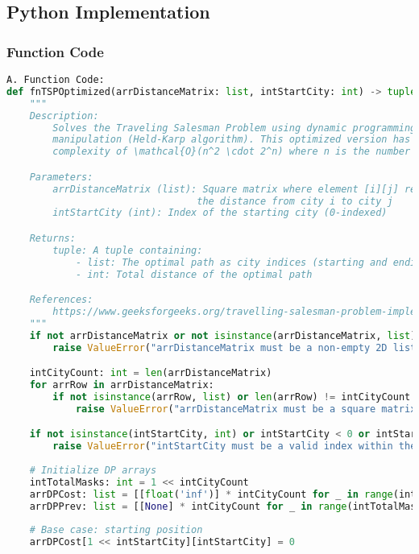 \documentclass{article}
\begin{document}
\subsection*{Python Implementation}
\subsubsection*{Function Code}
\begin{lstlisting}[language=Python]
A. Function Code:
def fnTSPOptimized(arrDistanceMatrix: list, intStartCity: int) -> tuple[list, int]:
    """
    Description:
        Solves the Traveling Salesman Problem using dynamic programming with bit 
        manipulation (Held-Karp algorithm). This optimized version has a time 
        complexity of \mathcal{O}(n^2 \cdot 2^n) where n is the number of cities.

    Parameters:
        arrDistanceMatrix (list): Square matrix where element [i][j] represents 
                                 the distance from city i to city j
        intStartCity (int): Index of the starting city (0-indexed)

    Returns:
        tuple: A tuple containing:
            - list: The optimal path as city indices (starting and ending with intStartCity)
            - int: Total distance of the optimal path

    References:
        https://www.geeksforgeeks.org/travelling-salesman-problem-implementation-using-dynamic-programming/
    """
    if not arrDistanceMatrix or not isinstance(arrDistanceMatrix, list):
        raise ValueError("arrDistanceMatrix must be a non-empty 2D list")

    intCityCount: int = len(arrDistanceMatrix)
    for arrRow in arrDistanceMatrix:
        if not isinstance(arrRow, list) or len(arrRow) != intCityCount:
            raise ValueError("arrDistanceMatrix must be a square matrix")

    if not isinstance(intStartCity, int) or intStartCity < 0 or intStartCity >= intCityCount:
        raise ValueError("intStartCity must be a valid index within the distance matrix")
    
    # Initialize DP arrays
    intTotalMasks: int = 1 << intCityCount
    arrDPCost: list = [[float('inf')] * intCityCount for _ in range(intTotalMasks)]
    arrDPPrev: list = [[None] * intCityCount for _ in range(intTotalMasks)]
    
    # Base case: starting position
    arrDPCost[1 << intStartCity][intStartCity] = 0
    

\end{lstlisting}
\end{document}
